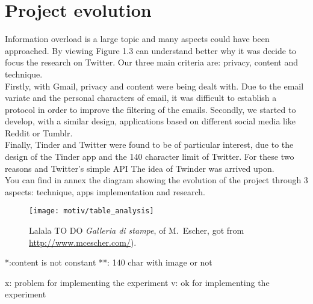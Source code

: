 \section{Project evolution}

Information overload is a large topic and many aspects could have been approached. By viewing Figure 1.3 can understand better why it was decide to focus the research on Twitter. Our three main criteria are: privacy, 
content and technique. \\
Firstly, with Gmail, privacy and content were being dealt with. Due to the email variate and the personal 
characters of email, it was difficult to establish a protocol in order to improve the filtering of the emails.
Secondly, we started to develop, with a similar design, applications based on different social media like 
Reddit or Tumblr.\\
Finally, Tinder and Twitter were found to be of particular interest, due to the design of the Tinder app and the 
140 character limit of Twitter. For these two reasons and Twitter's simple API The idea of Twinder was arrived 
upon.\\
You can find in annex the diagram showing the evolution of the project through 3 aspects: technique, apps 
implementation and research.

\begin{figure}[tb] 
\centering 
\texttt{[image: motiv/table\_analysis]} 
\caption[A floating figure]{Lalala TO DO  \emph{Galleria di stampe}, of M.~Escher, got from \url{http://www.mcescher.com/}).}
\label{fig:table_analysis} 
\end{figure}

 *:content is not constant
**: 140 char with image or not

x: problem for implementing the experiment
v: ok for implementing the experiment


